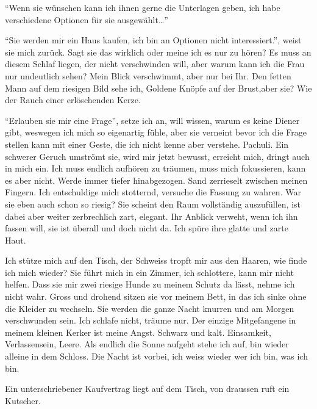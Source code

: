 \enquote{Wenn sie wünschen kann ich ihnen gerne die Unterlagen geben, ich habe verschiedene Optionen für sie ausgewählt\dots} 

\enquote{Sie werden mir ein Haus kaufen, ich bin an Optionen nicht interessiert.}, weist sie mich zurück. Sagt sie das wirklich oder meine ich es nur zu hören? Es muss an diesem Schlaf liegen, der nicht verschwinden will, aber warum kann ich die Frau nur undeutlich sehen? Mein Blick verschwimmt, aber nur bei Ihr. Den fetten Mann auf dem riesigen Bild sehe ich, Goldene Knöpfe auf der Brust,aber sie? Wie der Rauch einer erlöschenden Kerze.

\enquote{Erlauben sie mir eine Frage}, setze ich an, will wissen, warum es keine Diener gibt, weswegen ich mich so eigenartig fühle, aber sie verneint bevor ich die Frage stellen kann mit einer Geste, die ich nicht kenne aber verstehe. Pachuli. Ein schwerer Geruch umströmt sie, wird mir jetzt bewusst, erreicht mich, dringt auch in mich ein. Ich muss endlich aufhören zu träumen, muss mich fokussieren, kann es aber nicht. Werde immer tiefer hinabgezogen. Sand zerrieselt zwischen meinen Fingern. Ich entschuldige mich stotternd, versuche die Fassung zu wahren. War sie eben auch schon so riesig? Sie scheint den Raum vollständig auszufüllen, ist dabei aber weiter zerbrechlich zart, elegant. Ihr Anblick verweht, wenn ich ihn fassen will, sie ist überall und doch nicht da. Ich spüre ihre glatte und zarte Haut.

Ich stütze mich auf den Tisch, der Schweiss tropft mir aus den Haaren, wie finde ich mich wieder? Sie führt mich in ein Zimmer, ich schlottere, kann mir nicht helfen. Dass sie mir zwei riesige Hunde zu meinem Schutz da lässt, nehme ich nicht wahr. Gross und drohend sitzen sie vor meinem Bett, in das ich sinke ohne die Kleider zu wechseln. Sie werden die ganze Nacht knurren und am Morgen verschwunden sein. Ich schlafe nicht, träume nur. Der einzige Mitgefangene in meinem kleinen Kerker ist meine Angst. Schwarz und kalt. Einsamkeit, Verlassensein, Leere. Als endlich die Sonne aufgeht stehe ich auf, bin wieder alleine in dem Schloss. Die Nacht ist vorbei, ich weiss wieder wer ich bin, was ich bin. 

Ein unterschriebener Kaufvertrag liegt auf dem Tisch, von draussen ruft ein Kutscher. 
